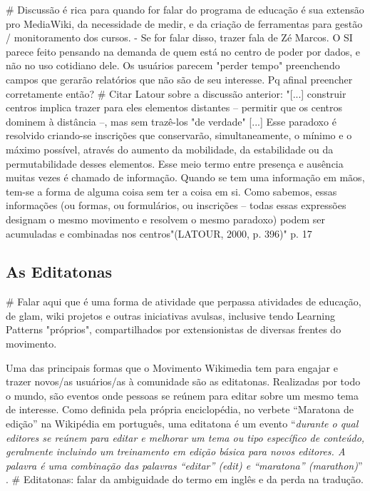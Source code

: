 # Discussão é rica para quando for falar do programa de educação é sua extensão pro MediaWiki, da necessidade de medir, e da criação de ferramentas para gestão / monitoramento dos cursos.
- Se for falar disso, trazer fala de Zé Marcos. O SI parece feito pensando na demanda de quem está no centro de poder por dados, e não no uso cotidiano dele. Os usuários parecem "perder tempo" preenchendo campos que gerarão relatórios que não são de seu interesse. Pq afinal preencher corretamente então?
# Citar Latour sobre a discussão anterior:
"[...] construir centros implica trazer para eles elementos distantes – permitir que os centros dominem à distância –, mas sem trazê-los "de verdade" [...] Esse paradoxo é resolvido criando-se inscrições que conservarão, simultaneamente, o mínimo e o máximo possível, através do aumento da mobilidade, da estabilidade ou da permutabilidade desses elementos. Esse meio termo entre presença e ausência muitas vezes é chamado de informação. Quando se tem uma informação em mãos, tem-se a forma de alguma coisa sem ter a coisa em si. Como sabemos, essas informações (ou formas, ou formulários, ou inscrições – todas essas expressões designam o mesmo movimento e resolvem o mesmo paradoxo) podem ser acumuladas e combinadas nos centros"(LATOUR, 2000, p. 396)" p. 17

\subsection{As Editatonas}

# Falar aqui que é uma forma de atividade que perpassa atividades de educação, de glam, wiki projetos e outras iniciativas avulsas, inclusive tendo Learning Patterns "próprios", compartilhados por extensionistas de diversas frentes do movimento.

Uma das principais formas que o Movimento Wikimedia tem para engajar e trazer novos/as usuários/as à comunidade são as editatonas. Realizadas por todo o mundo, são eventos onde pessoas se reúnem para editar sobre um mesmo tema de interesse. Como definida pela própria enciclopédia, no verbete ``Maratona de edição'' na Wikipédia em português, uma editatona é um evento ``\textit{durante o qual editores se reúnem para editar e melhorar um tema ou tipo específico de conteúdo, geralmente incluindo um treinamento em edição básica para novos editores. A palavra é uma combinação das palavras ``editar'' (\textit{edit}) e ``maratona'' (\textit{marathon})}'' .
# Editatonas: falar da ambiguidade do termo em inglês e da perda na tradução.

